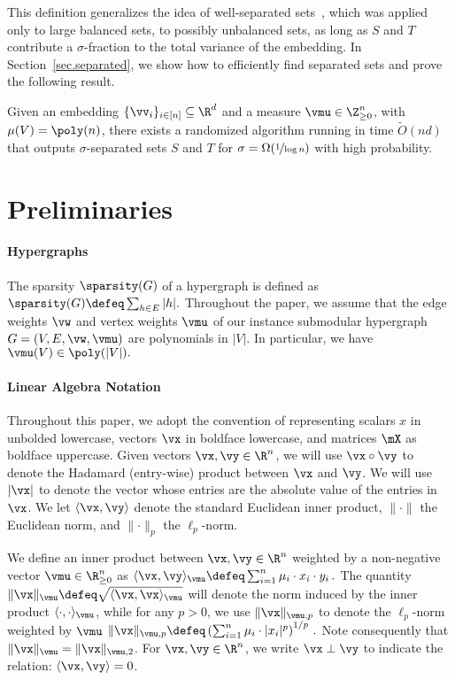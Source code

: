 \documentclass[letterpaper]{article}
\begin{document}
This definition generalizes the idea of well-separated sets~\cite{ARV2009}, which was applied only to large balanced sets, to possibly unbalanced sets, as long as $S$ and $T$ contribute a $\sigma$-fraction to the total variance of the embedding.
In Section~\ref{sec.separated}, we show how to efficiently find separated sets and prove the following result.

\begin{theorem}
\label{thm:separated}
Given an embedding $\{\vv_i\}_{i\in [n]} \subseteq \R^d$ and a measure $\vmu \in \Z^n_{\geq 0}$, with $\mu(V) = \poly(n)$, there exists a randomized algorithm running in time $\tilde{O}(nd)$ that outputs $\sigma$-separated sets $S$ and $T$ for $\sigma = \Omega(\nicefrac{1}{\log n})$ with high probability.
\end{theorem}
 

\section{Preliminaries}\label{sec.preliminaries}

\paragraph{Hypergraphs} The sparsity $\sparsity(G)$ of a hypergraph is defined as $ \sparsity (G) \defeq \sum_{h\in E} |h|.$ Throughout the paper, we assume that the edge weights $\vw$ and vertex weights $\vmu$ of our instance submodular hypergraph $G=(V, E, \vw,\vmu)$ are polynomials in $|V|.$ In particular, we have ${\vmu}(V) \in \poly(|V|).$

\paragraph{Linear Algebra Notation}
Throughout this paper, we adopt the convention of representing scalars $x$ in unbolded lowercase, vectors $\vx$ in boldface lowercase, and matrices $\mX$ as boldface uppercase.
Given vectors $\vx, \vy \in \R^n$, we will use $\vx \circ \vy$ to denote the Hadamard (entry-wise) product between $\vx$ and $\vy$.
We will  use $\lvert \vx \rvert$ to denote the vector whose entries are the absolute value of the entries in $\vx$.
We let $\langle \vx, \vy \rangle$ denote the standard Euclidean inner product, $\lVert \cdot \rVert$ the Euclidean norm, and $\lVert \cdot \rVert_p$ the $\ell_p$-norm.


We define an inner product between $\vx, \vy \in \R^n$ weighted by a non-negative vector $\vmu \in \R^n_{\geq 0}$ as
$
\langle \vx, \vy \rangle_{\vmu} \defeq \sum_{i=1}^n \mu_i \cdot x_i\cdot y_i \, .
$
The quantity $\lVert \vx \rVert_{\vmu} \defeq \sqrt{\langle \vx, \vx \rangle_{\vmu}}$ will denote the norm induced by the inner product $\langle \cdot, \cdot \rangle_{\vmu}$, while for any $p > 0$, we use $\lVert \vx \rVert_{\vmu, p}$ to denote the $\ell_p$-norm weighted by $\vmu$
$
\lVert \vx \rVert_{\vmu, p}
\defeq \left( \sum_{i=1}^n \mu_i \cdot \lvert x_i \rvert^p \right)^{1/p} \, .
$
Note consequently that $\lVert \vx \rVert_{\vmu} = \lVert \vx \rVert_{\vmu, 2}$. For $\vx, \vy \in \R^n$, we write $\vx \perp \vy$ to indicate the relation: $\langle\vx,\vy\rangle = 0$.
\end{document}
